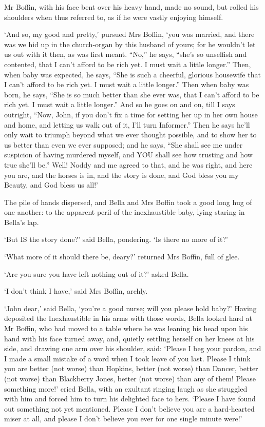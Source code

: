 Mr Boffin, with his face bent over his heavy hand, made no sound,
but rolled his shoulders when thus referred to, as if he were vastly
enjoying himself.

‘And so, my good and pretty,’ pursued Mrs Boffin, ‘you was married, and
there was we hid up in the church-organ by this husband of yours; for
he wouldn’t let us out with it then, as was first meant. “No,” he says,
“she’s so unselfish and contented, that I can’t afford to be rich yet. I
must wait a little longer.” Then, when baby was expected, he says, “She
is such a cheerful, glorious housewife that I can’t afford to be rich
yet. I must wait a little longer.” Then when baby was born, he says,
“She is so much better than she ever was, that I can’t afford to be rich
yet. I must wait a little longer.” And so he goes on and on, till I says
outright, “Now, John, if you don’t fix a time for setting her up in her
own house and home, and letting us walk out of it, I’ll turn Informer.”
 Then he says he’ll only wait to triumph beyond what we ever thought
possible, and to show her to us better than even we ever supposed; and
he says, “She shall see me under suspicion of having murdered myself,
and YOU shall see how trusting and how true she’ll be.” Well! Noddy and
me agreed to that, and he was right, and here you are, and the horses is
in, and the story is done, and God bless you my Beauty, and God bless us
all!’

The pile of hands dispersed, and Bella and Mrs Boffin took a good long
hug of one another: to the apparent peril of the inexhaustible baby,
lying staring in Bella’s lap.

‘But IS the story done?’ said Bella, pondering. ‘Is there no more of
it?’

‘What more of it should there be, deary?’ returned Mrs Boffin, full of
glee.

‘Are you sure you have left nothing out of it?’ asked Bella.

‘I don’t think I have,’ said Mrs Boffin, archly.

‘John dear,’ said Bella, ‘you’re a good nurse; will you please hold
baby?’ Having deposited the Inexhaustible in his arms with those words,
Bella looked hard at Mr Boffin, who had moved to a table where he was
leaning his head upon his hand with his face turned away, and, quietly
settling herself on her knees at his side, and drawing one arm over his
shoulder, said: ‘Please I beg your pardon, and I made a small mistake of
a word when I took leave of you last. Please I think you are better (not
worse) than Hopkins, better (not worse) than Dancer, better (not worse)
than Blackberry Jones, better (not worse) than any of them! Please
something more!’ cried Bella, with an exultant ringing laugh as she
struggled with him and forced him to turn his delighted face to hers.
‘Please I have found out something not yet mentioned. Please I don’t
believe you are a hard-hearted miser at all, and please I don’t believe
you ever for one single minute were!’

